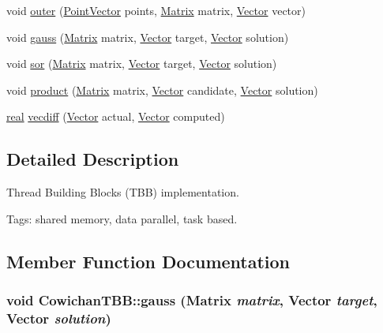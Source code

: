 \begin{CompactItemize}
void \hyperlink{class_cowichan_t_b_b_92a763b9733cdcceda13b7b7ea0bc229}{outer} (\hyperlink{class_point}{PointVector} points, \hyperlink{cowichan_8hpp_3fb46f939e55c239fbc95656fc0f3399}{Matrix} matrix, \hyperlink{cowichan_8hpp_02bc1553e241b9b33408482658b3c355}{Vector} vector)
\item 
void \hyperlink{class_cowichan_t_b_b_d51868e0e65482f7c9e69d73b3904822}{gauss} (\hyperlink{cowichan_8hpp_3fb46f939e55c239fbc95656fc0f3399}{Matrix} matrix, \hyperlink{cowichan_8hpp_02bc1553e241b9b33408482658b3c355}{Vector} target, \hyperlink{cowichan_8hpp_02bc1553e241b9b33408482658b3c355}{Vector} solution)
\item 
void \hyperlink{class_cowichan_t_b_b_dbb32ce457d0edca6815ab1cb2459276}{sor} (\hyperlink{cowichan_8hpp_3fb46f939e55c239fbc95656fc0f3399}{Matrix} matrix, \hyperlink{cowichan_8hpp_02bc1553e241b9b33408482658b3c355}{Vector} target, \hyperlink{cowichan_8hpp_02bc1553e241b9b33408482658b3c355}{Vector} solution)
\item 
void \hyperlink{class_cowichan_t_b_b_f3144458520e2dff1f9fad5753f6fc3d}{product} (\hyperlink{cowichan_8hpp_3fb46f939e55c239fbc95656fc0f3399}{Matrix} matrix, \hyperlink{cowichan_8hpp_02bc1553e241b9b33408482658b3c355}{Vector} candidate, \hyperlink{cowichan_8hpp_02bc1553e241b9b33408482658b3c355}{Vector} solution)
\item 
\hyperlink{cowichan_8hpp_4d521b2c54a1f6312cc8fa04827eaf98}{real} \hyperlink{class_cowichan_t_b_b_28c976743df231fd183e4db9306050b1}{vecdiff} (\hyperlink{cowichan_8hpp_02bc1553e241b9b33408482658b3c355}{Vector} actual, \hyperlink{cowichan_8hpp_02bc1553e241b9b33408482658b3c355}{Vector} computed)
\end{CompactItemize}


\subsection{Detailed Description}
Thread Building Blocks (TBB) implementation. 

Tags: shared memory, data parallel, task based. 

\subsection{Member Function Documentation}
\hypertarget{class_cowichan_t_b_b_d51868e0e65482f7c9e69d73b3904822}{
\subsubsection[{gauss}]{\setlength{\rightskip}{0pt plus 5cm}void CowichanTBB::gauss ({\bf Matrix} {\em matrix}, \/  {\bf Vector} {\em target}, \/  {\bf Vector} {\em solution})}}
\label{class_cowichan_t_b_b_d51868e0e65482f7c9e69d73b3904822}



